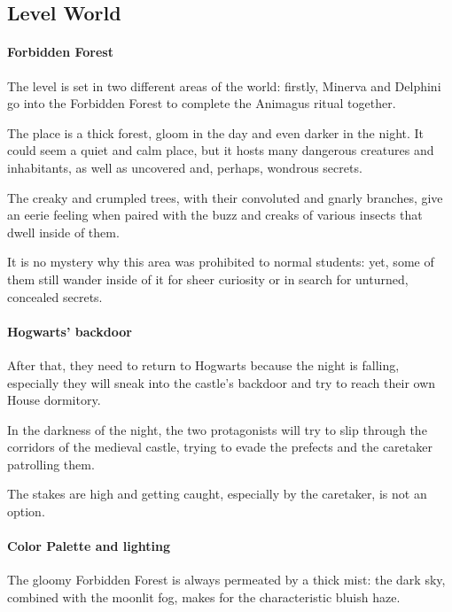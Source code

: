 \subsection{Level World}

\paragraph{Forbidden Forest}
The level is set in two different areas of the world: firstly, Minerva and Delphini go into the Forbidden Forest to complete the Animagus ritual together. 

The place is a thick forest, gloom in the day and even darker in the night. It could seem a quiet and calm place, but it hosts many dangerous creatures and inhabitants, as well as uncovered and, perhaps, wondrous secrets.


The creaky and crumpled trees, with their convoluted and gnarly branches, give an eerie feeling when paired with the buzz and creaks of various insects that dwell inside of them.

It is no mystery why this area was prohibited to normal students: yet, some of them still wander inside of it for sheer curiosity or in search for unturned, concealed secrets.

\clearpage

\paragraph{Hogwarts' backdoor}

After that, they need to return to Hogwarts because the night is falling, especially they will sneak into the castle's backdoor and try to reach their own House dormitory.


In the darkness of the night, the two protagonists will try to slip through the corridors of the medieval castle, trying to evade the prefects and the caretaker patrolling them.


The stakes are high and getting caught, especially by the caretaker, is not an option. 

\clearpage

\paragraph{Color Palette and lighting}
The gloomy Forbidden Forest is always permeated by a thick mist: the dark sky, combined with the moonlit fog, makes for the characteristic bluish haze.

